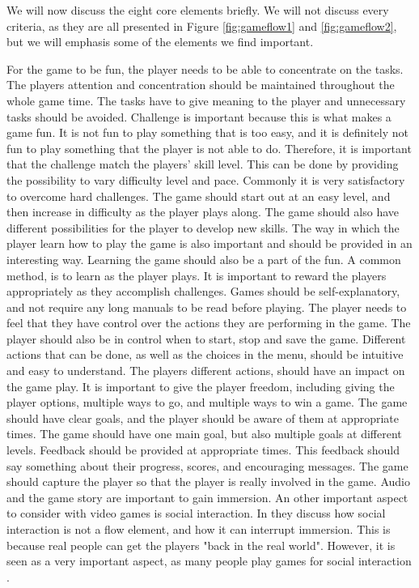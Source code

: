 We will now discuss the eight core elements briefly. We will not discuss every criteria, as they are all presented in Figure \ref{fig:gameflow1} and \ref{fig:gameflow2}, but we will emphasis some of the elements we find important. 

For the game to be fun, the player needs to be able to concentrate on the tasks. The players attention and concentration should be maintained throughout the whole game time. The tasks have to give meaning to the player and unnecessary tasks should be avoided. Challenge is important because this is what makes a game fun. It is not fun to play something that is too easy, and it is definitely not fun to play something that the player is not able to do. Therefore, it is important that the challenge match the players' skill level. This can be done by providing the possibility to vary difficulty level and pace. Commonly it is very satisfactory to overcome hard challenges. The game should start out at an easy level, and then increase in difficulty as the player plays along. The game should also have different possibilities for the player to develop new skills. The way in which the player learn how to play the game is also important and should be provided in an interesting way. Learning the game should also be a part of the fun. A common method, is to learn as the player plays. It is important to reward the players appropriately as they accomplish challenges.  Games should be self-explanatory, and not require any long manuals to be read before playing. The player needs to feel that they have control over the actions they are performing in the game. The player should also be in control when to start, stop and save the game. Different actions that can be done, as well as the choices in the menu, should be intuitive and easy to understand. The players different actions, should have an impact on the game play. It is important to give the player freedom, including giving the player options, multiple ways to go, and multiple ways to win a game. The game should have clear goals, and the player should be aware of them at appropriate times. The game should have one main goal, but also multiple goals at different levels. Feedback should be provided at appropriate times. This feedback should say something about their progress, scores, and encouraging messages. The game should capture the player so that the player is really involved in the game. Audio and the game story are important to gain immersion. An other important aspect to consider with video games is social interaction. In \cite{sweetser} they discuss how social interaction is not a flow element, and how it can interrupt immersion. This is because real people can get the players "back in the real world". However, it is seen as a very important aspect, as many people play games for social interaction \cite{sweetser}.

